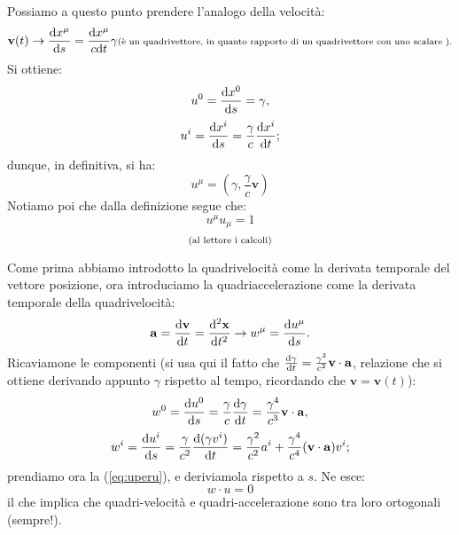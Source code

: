 \begin{definizione}[La quadrivelocit\`a]
 Possiamo a questo punto prendere l'analogo
della velocit\`a:
\begin{equation}
 \mathbf{v}(t)\rightarrow \frac{\mathrm{d} x^{\mu}}{\mathrm{d} s}=\frac{\mathrm{d}
x^{\mu}}{c\mathrm{d} t}\gamma  \mbox{\scriptsize(\`e un quadrivettore,
in quanto rapporto di un quadrivettore con uno scalare ).}
\end{equation}
Si ottiene:
\begin{equation}
 u^0=\frac{\mathrm{d} x^0}{\mathrm{d} s}=\gamma,
\end{equation}
\begin{equation}
 u^i=\frac{\mathrm{d} x^i}{\mathrm{d} s}=\frac{\gamma}{c}\frac{\mathrm{d} x^i}{\mathrm{d} t};
\end{equation}
dunque, in def\mbox{}initiva, si ha:
\begin{equation}
 u^{\mu}=\left(\gamma,\frac{\gamma}{c}\mathbf{v}\right)
\end{equation}
Notiamo poi che dalla def\mbox{}inizione segue che:
\begin{equation}
 u^{\mu}u_{\mu}=1\label{eq:uperu}
\end{equation}
\begin{equation}
 \mbox{\scriptsize(al lettore i calcoli)}
\end{equation}
\end{definizione}
\begin{definizione}[La quadriaccelerazione]
 Come prima abbiamo introdotto la
quadrivelocit\`a come la derivata temporale del vettore posizione,
ora introduciamo la quadriaccelerazione come la derivata temporale
della quadrivelocit\`a:
\begin{displaymath}
 \mathbf{a}=\frac{\mathrm{d} \mathbf{v}}{\mathrm{d} t}=\frac{\mathrm{d}^2 \mathbf{x}}{\mathrm{d}
t^2}\rightarrow w^{\mu}=\frac{\mathrm{d} u^{\mu}}{\mathrm{d} s}.
\end{displaymath}
Ricaviamone le componenti (si usa qui il fatto che $\frac{\mathrm{d}
\gamma}{\mathrm{d} t}=\frac{\gamma^3}{c^2}\mathbf{v}\cdot\mathbf{a}$,
relazione che si ottiene derivando appunto $\gamma$ rispetto al
tempo, ricordando che $\mathbf{v}=\mathbf{v}(t)$):
\begin{displaymath}
 w^0=\frac{\mathrm{d} u^0}{\mathrm{d} s}=\frac{\gamma}{c}\frac{\mathrm{d} \gamma}{\mathrm{d}
t}=\frac{\gamma^4}{c^3}\mathbf{v}\cdot\mathbf{a},
\end{displaymath}
\begin{equation}
 w^i=\frac{\mathrm{d} u^i}{\mathrm{d} s}=\frac{\gamma}{c^2} 
\frac{\mathrm{d} (\gamma v^i)}{\mathrm{d} t} 
  =
  \frac{\gamma^2}{c^2}a^i + 
  \frac{\gamma^4}{c^4}(\mathbf{v}\cdot\mathbf{a})v^i; 
\end{equation}
prendiamo ora la (\ref{eq:uperu}), e deriviamola rispetto a $s$.
Ne esce:
\begin{equation}
w\cdot u=0 \label{eq:perpendicolari}
\end{equation}
il che implica che quadri-velocit\`a e quadri-accelerazione sono tra loro
ortogonali (sempre!).
\end{definizione}
